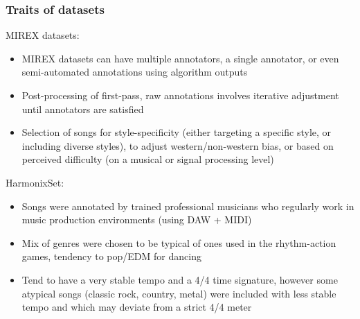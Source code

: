 \documentclass{beamer}
\begin{document}
\begin{frame}
	\frametitle{Traits of datasets}
	MIREX datasets:
	\begin{itemize}
		\item
			MIREX datasets can have multiple annotators, a single annotator, or even semi-automated annotations using algorithm outputs
		\item
			Post-processing of first-pass, raw annotations involves iterative adjustment until annotators are satisfied
		\item
			Selection of songs for style-specificity (either targeting a specific style, or including diverse styles), to adjust western/non-western bias, or based on perceived difficulty (on a musical or signal processing level)
	\end{itemize}
	HarmonixSet:
	\begin{itemize}
		\item
			Songs were annotated by trained professional musicians who regularly work in music production environments (using DAW + MIDI)
		\item
			Mix of genres were chosen to be typical of ones used in the rhythm-action games, tendency to pop/EDM for dancing
		\item
			Tend to have a very stable tempo and a 4/4 time signature, however some atypical songs (classic rock, country, metal) were included with less stable tempo and which may deviate from a strict 4/4 meter
	\end{itemize}
\end{frame}

\end{document}
